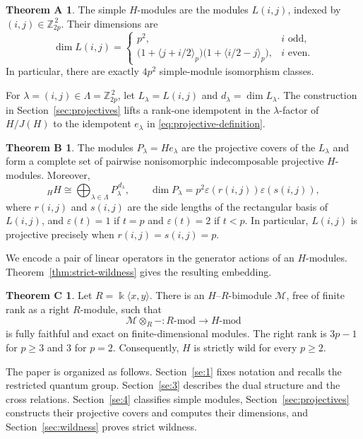 \documentclass[10pt,oneside]{amsart}
\newcommand{\kk}{\Bbbk}
\newcommand{\res}[1]{\langle #1\rangle_p}
\theoremstyle{definition}
\begin{document}
\newtheorem*{introresultA}{Theorem A}
\newtheorem*{introresultB}{Theorem B}
\newtheorem*{introresultC}{Theorem C}
\begin{introresultA}
The simple $H$-modules are the modules $L(i,j)$, indexed by $(i,j)\in\mathbb Z_{2p}^{\,2}$. Their dimensions are
\[
 \dim L(i,j)=
 \begin{cases}
 p^2,&i\text{ odd},\\
 \bigl(1+\res{j+i/2}\bigr)\bigl(1+\res{i/2-j}\bigr),&i\text{ even}.
 \end{cases}
\]
In particular, there are exactly $4p^2$ simple-module isomorphism classes.
\end{introresultA}

For $\lambda=(i,j)\in\Lambda=\mathbb Z_{2p}^{\,2}$, let $L_\lambda=L(i,j)$ and $d_\lambda=\dim L_\lambda$. The construction in Section~\ref{sec:projectives} lifts a rank-one idempotent in the $\lambda$-factor of $H/J(H)$ to the idempotent $e_\lambda$ in \eqref{eq:projective-definition}.

\begin{introresultB}
The modules $P_\lambda=He_\lambda$ are the projective covers of the $L_\lambda$ and form a complete set of pairwise nonisomorphic indecomposable projective $H$-modules. Moreover,
\[
 {}_HH\cong\bigoplus_{\lambda\in\Lambda}P_\lambda^{\,d_\lambda},
 \qquad
 \dim P_\lambda=p^2\varepsilon(r(i,j))\varepsilon(s(i,j)),
\]
where $r(i,j)$ and $s(i,j)$ are the side lengths of the rectangular basis of $L(i,j)$, and $\varepsilon(t)=1$ if $t=p$ and $\varepsilon(t)=2$ if $t<p$. In particular, $L(i,j)$ is projective precisely when $r(i,j)=s(i,j)=p$.
\end{introresultB}

We encode a pair of linear operators in the generator actions of an $H$-modules. Theorem~\ref{thm:strict-wildness} gives the resulting embedding.

\begin{introresultC}
Let $R=\kk\langle x,y\rangle$. There is an $H$--$R$-bimodule $\mathcal M$, free of finite rank as a right $R$-module, such that
\[
 \mathcal M\otimes_R-:
 R\text{-}\mathrm{mod}\longrightarrow H\text{-}\mathrm{mod}
\]
is fully faithful and exact on finite-dimensional modules. The right rank is $3p-1$ for $p\ge3$ and $3$ for $p=2$. Consequently, $H$ is strictly wild for every $p\ge2$.
\end{introresultC}

The paper is organized as follows. Section~\ref{se:1} fixes notation and recalls the restricted quantum group. Section~\ref{se:3} describes the dual structure and the cross relations. Section~\ref{se:4} classifies simple modules, Section~\ref{sec:projectives} constructs their projective covers and computes their dimensions, and Section~\ref{sec:wildness} proves strict wildness.
\end{document}
